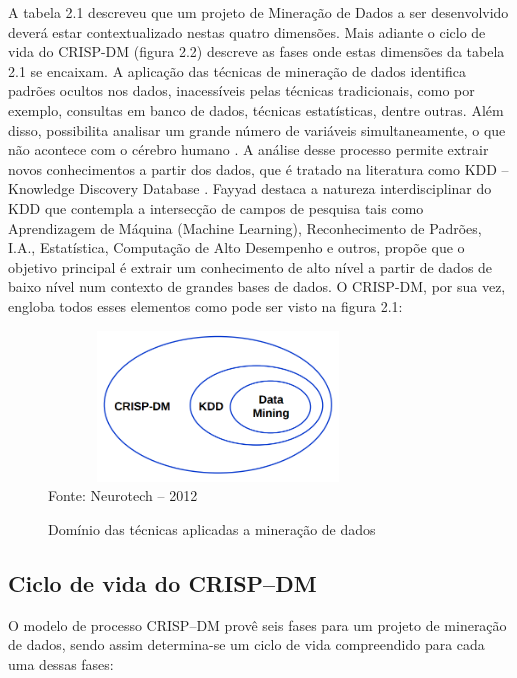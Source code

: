 A tabela 2.1 descreveu que um projeto de Mineração de Dados a ser desenvolvido deverá estar contextualizado nestas quatro dimensões. 
Mais adiante o ciclo de vida do CRISP-DM (figura 2.2) descreve as fases onde estas dimensões da tabela 2.1 se encaixam.
A aplicação das técnicas de mineração de dados identifica padrões ocultos nos dados, inacessíveis pelas técnicas tradicionais,
como por exemplo, consultas em banco de dados, técnicas estatísticas, dentre outras. Além disso, possibilita analisar um grande número de 
variáveis simultaneamente, o que não acontece com o cérebro humano \cite{possas1998data}. 
A análise desse processo permite extrair novos conhecimentos a partir dos dados, que é tratado na literatura como 
KDD -- Knowledge Discovery Database \cite{FayyadUeoutros}. Fayyad \cite{FayyadUeoutros} destaca a natureza interdisciplinar do KDD que contempla a intersecção 
de campos de pesquisa tais como Aprendizagem de Máquina (Machine Learning), Reconhecimento de Padrões, I.A., Estatística, Computação de Alto Desempenho e outros, propõe que o objetivo principal é extrair um conhecimento de alto nível a partir de dados de baixo nível num contexto de 
grandes bases de dados.
O CRISP-DM, por sua vez, engloba todos esses elementos como pode ser visto na figura 2.1:

\begin{figure}[!ht]
\centering
\caption{Domínio das técnicas aplicadas a mineração de dados}
\vspace{1mm}
\includegraphics[width=90mm, height=40mm]{Figuras/BigData/RelacaoCrispKddDm.png}\\
\tiny Fonte: Neurotech -- 2012
\end{figure}


\subsection{Ciclo de vida do CRISP--DM}

O modelo de processo CRISP--DM provê seis fases para um projeto de mineração de dados, sendo assim determina-se um ciclo de vida 
compreendido para cada uma dessas fases:

